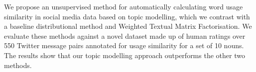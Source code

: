 We propose an unsupervised method for automatically calculating word usage similarity in social media data based on topic modelling, which we contrast
 with a baseline distributional method and Weighted Textual Matrix
 Factorisation. We evaluate these methods against a novel dataset made up of
 human ratings over 550 Twitter message pairs annotated for usage similarity for
 a set of 10 nouns. The results show that our topic modelling approach
 outperforms the other two methods.

